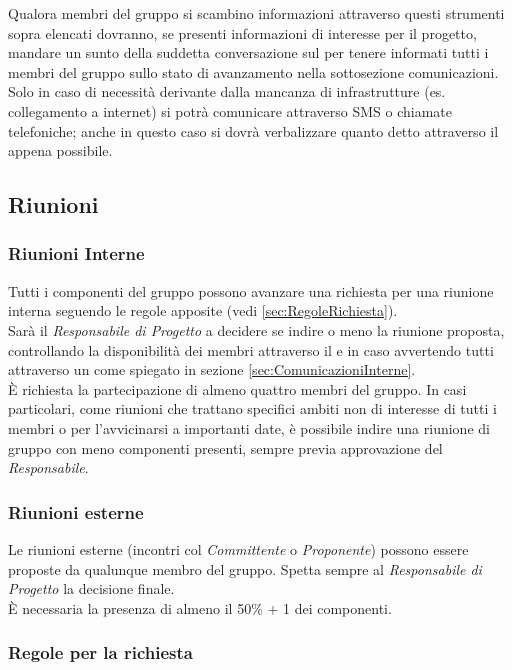 \documentclass{scalatekids-article}
\begin{document}
Qualora membri del gruppo si scambino informazioni attraverso questi strumenti
sopra elencati dovranno, se presenti informazioni di interesse per il progetto,
mandare un sunto della suddetta conversazione sul  per tenere
informati tutti i membri del gruppo sullo stato di avanzamento nella
sottosezione comunicazioni.\\ Solo in caso di necessità derivante dalla mancanza
di infrastrutture (es. collegamento a internet) si potrà comunicare attraverso
SMS o chiamate telefoniche; anche in questo caso si dovrà verbalizzare quanto
detto attraverso il  appena possibile.

\subsection{Riunioni}

\subsubsection{Riunioni Interne}

Tutti i componenti del gruppo possono avanzare una richiesta per una riunione
interna seguendo le regole apposite (vedi \ref{sec:RegoleRichiesta}).\\
Sarà il \textit{Responsabile di Progetto} a decidere se indire
o meno la riunione proposta, controllando la disponibilità dei membri attraverso il
 e in caso avvertendo tutti attraverso un  come
spiegato in sezione \ref{sec:ComunicazioniInterne}.\\ È richiesta la partecipazione di
almeno quattro membri del gruppo. In casi particolari, come riunioni che
trattano specifici ambiti non di interesse di tutti i membri o per l'avvicinarsi
a importanti date, è possibile indire una riunione di gruppo con meno componenti
presenti, sempre previa approvazione del \textit{Responsabile}.

\subsubsection{Riunioni esterne}

Le riunioni esterne (incontri col \textit{Committente} o \textit{Proponente}) possono essere
proposte da qualunque membro del gruppo. Spetta sempre al \textit{Responsabile
di Progetto} la decisione finale.\\ È necessaria la presenza di almeno il
50\% + 1 dei componenti.

\subsubsection{Regole per la richiesta}
\end{document}
